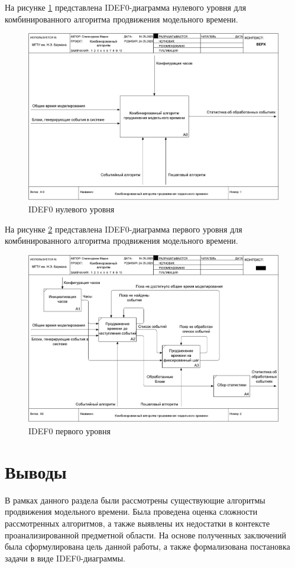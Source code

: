На рисунке \ref{img:IDEF0-A0} представлена IDEF0-диаграмма нулевого уровня для комбинированного алгоритма продвижения модельного времени.
\begin{figure}[h!btp]
	\centering
	\includegraphics[width=1\columnwidth]{inc/img/IDEF0-A0.pdf}
	\caption{IDEF0 нулевого уровня}
	\label{img:IDEF0-A0}	
\end{figure}
\clearpage
На рисунке \ref{img:IDEF0-A1} представлена IDEF0-диаграмма первого уровня для комбинированного алгоритма продвижения модельного времени.
\begin{figure}[h!btp]
	\centering
	\includegraphics[width=1\columnwidth]{inc/img/IDEF0-A1.pdf}
	\caption{IDEF0 первого уровня}
	\label{img:IDEF0-A1}	
\end{figure}

\section{Выводы}
В рамках данного раздела были рассмотрены существующие алгоритмы продвижения модельного времени. Была проведена оценка сложности рассмотренных алгоритмов, а также выявлены их недостатки в контексте проанализированной предметной области. На основе полученных заключений была сформулирована цель данной работы, а также формализована постановка задачи в виде IDEF0-диаграммы.
